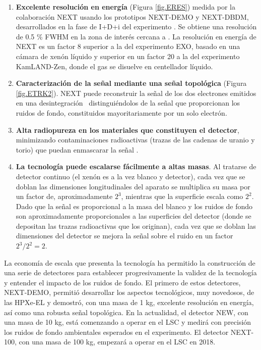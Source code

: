 \begin{enumerate}
\item {\bf Excelente resolución en energía} (Figura \ref{fig.ERES}) medida por la colaboración NEXT usando los prototipos NEXT-DEMO y NEXT-DBDM, desarrollados en la fase de I+D+i del experimento . Se obtiene una resolución de 0.5 \% FWHM en la zona de interés cercana a \Qbb. La resolución en energía de NEXT es un factor 8 superior a la del experimento EXO, basado en una cámara de xenón líquido y superior en un factor 20 a la del experimento KamLAND-Zen, donde el gas se disuelve en centellador líquido. 
\item {\bf Caracterización de la señal mediante una señal topológica} (Figura \ref{fig.ETRK2}). NEXT puede reconstruir la señal de los dos electrones emitidos en una desintegración \bb\, distinguiéndolos de la señal que proporcionan los ruidos de fondo, constituidos mayoritariamente por un solo electrón.
\item {\bf Alta radiopureza en los materiales que constituyen el detector}, minimizando contaminaciones radioactivas (trazas de las cadenas de uranio y torio) que puedan enmascarar la señal \bbonu.
\item {\bf La tecnología puede escalarse fácilmente a altas masas}. Al tratarse de detector continuo (el xenón es a la vez blanco y detector), cada vez que se doblan las dimensiones longitudinales del aparato se multiplica su masa por un factor de, aproximadamente $2^3$, mientras que la superficie escala como $2^2$. Dado que la señal es proporcional a la masa del blanco y los ruidos de fondo son aproximadamente proporcionales a las superficies del detector (donde se depositan las trazas radioactivas que los originan), cada vez que se doblan las dimensiones del detector se mejora la señal sobre el ruido en un factor $2^3/2^2 = 2$. 
\end{enumerate}

La economía de escala que presenta la tecnología  ha permitido la construcción de una serie de detectores para establecer progresivamente la validez de la tecnología y entender el impacto de los ruidos de fondo. El primero de estos detectores, NEXT-DEMO, permitió desarrollar los aspectos tecnológicos, muy novedosos, de las HPXe-EL y demostró, con una masa de 1 kg, excelente resolución en energía, así como una robusta señal topológica. En la actualidad, el detector NEW, con una masa de 10 kg, está comenzando a operar en el LSC y medirá con precisión los ruidos de fondo ambientales esperados en el experimento. El detector NEXT-100, con una masa de 100 kg, empezará a operar en el LSC en 2018. 


